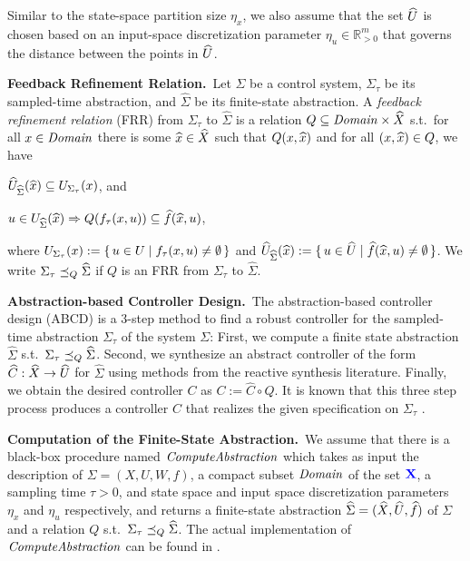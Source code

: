 Similar to the state-space partition size $\eta_x$, we also assume that the set $\widehat{U}$ is chosen based on an input-space discretization parameter $\eta_u\in \mathbb{R}^m_{>0}$ that governs the distance between the points in $\widehat{U}$.

\smallskip
\noindent\textbf{Feedback Refinement Relation.}\
Let $\Sigma$ be a control system, $\Sigma_\tau$ be its sampled-time abstraction, and $\widehat{\Sigma}$ be its finite-state abstraction.
A \emph{feedback refinement relation} (FRR) from $\Sigma_\tau$ to $\widehat{\Sigma}$ 
is a relation $Q\subseteq \mathit{Domain}\times \widehat{X}$ s.t.\ 
for all $x\in \mathit{Domain}$ there is some $\widehat{x}\in \widehat{X}$ such that $Q(x,\widehat{x})$ and
for all $(x,\widehat{x})\in Q$, we have
\begin{inparaenum}[(i)]
 \item $\widehat{U}_{\widehat{\Sigma}}(\widehat{x})\subseteq U_{\Sigma_\tau}(x)$, and 
 \item $u\in U_{\widehat{\Sigma}}(\widehat{x}) \Rightarrow Q(f_\tau(x,u))\subseteq \widehat{f}(\widehat{x},u)$,
\end{inparaenum}
where $U_{\Sigma_\tau}(x):=\set{u\in U \mid f_\tau(x,u)\neq \emptyset}$ and $\widehat{U}_{\widehat{\Sigma}}(\widehat{x}):=\set{u\in \widehat{U}\mid \widehat{f}(\widehat{x},u)\neq \emptyset}$.
We write $\Sigma_\tau \preceq_{Q} \widehat{\Sigma}$ if $Q$ is an FRR from $\Sigma_\tau$ to $\widehat{\Sigma}$.

\smallskip
\noindent\textbf{Abstraction-based Controller Design.}\
The abstraction-based controller design (ABCD) \cite{reissig2016feedback} is a $3$-step method to find a robust controller for the sampled-time abstraction $\Sigma_\tau$ of the system $\Sigma$:
First, we compute a finite state abstraction $\widehat{\Sigma}$ s.t.\ $\Sigma_\tau \preceq_{Q} \widehat{\Sigma}$.
Second, we synthesize an abstract controller of the form $\widehat{C}:\widehat{X}\rightarrow \widehat{U}$ for $\widehat{\Sigma}$ using methods from the reactive synthesis literature.
Finally, we obtain the desired controller $C$ as $C:=\widehat{C}\circ Q$.
It is known that this three step process produces a controller $C$ that realizes the given specification on $\Sigma_\tau$ \cite{reissig2016feedback}.

\smallskip
\noindent\textbf{Computation of the Finite-State Abstraction.}\
We assume that there is a black-box procedure named $\mathit{ComputeAbstraction}$ which takes as input the description of $\Sigma = (X,U,W,f)$, a compact subset $\mathit{Domain}$ of the set ${\color{blue} \mathbf{X}}$, a sampling time $\tau>0$, and state space and input space discretization parameters $\eta_x$ and $\eta_u$ respectively, and returns a finite-state abstraction $\widehat{\Sigma} = (\widehat{X},\widehat{U},\widehat{f})$ of $\Sigma$ and a relation $Q$ s.t.\ $\Sigma_\tau \preceq_{Q} \widehat{\Sigma}$.
The actual implementation of $\mathit{ComputeAbstraction}$ can be found in \cite{reissig2016feedback}.

